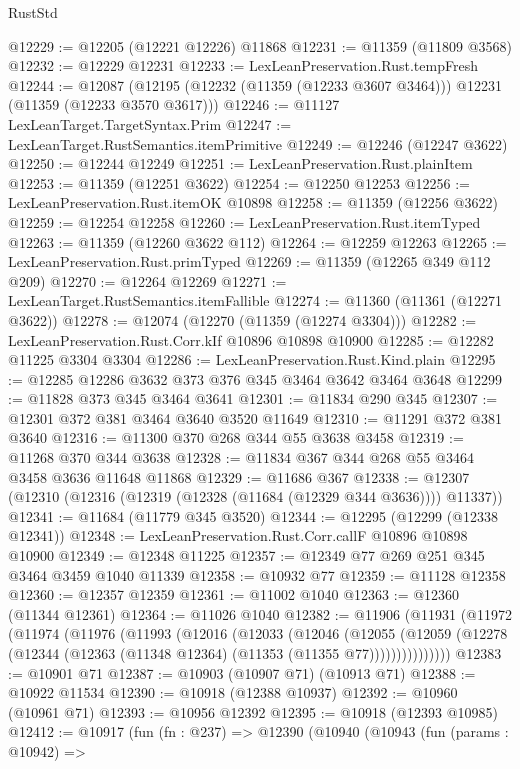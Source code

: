 \begin{lexlean}{RustStd}
\begin{coremodule}
{{{{{{{{{{{{{{{{{{{@12229 := @12205 (@12221 @12226) @11868
@12231 := @11359 (@11809 @3568)
@12232 := @12229 @12231
@12233 := LexLeanPreservation.Rust.tempFresh
@12244 := @12087
    (@12195 (@12232 (@11359 (@12233 @3607 @3464))) @12231 (@11359 (@12233 @3570 @3617)))
@12246 := @11127 LexLeanTarget.TargetSyntax.Prim
@12247 := LexLeanTarget.RustSemantics.itemPrimitive
@12249 := @12246 (@12247 @3622)
@12250 := @12244 @12249
@12251 := LexLeanPreservation.Rust.plainItem
@12253 := @11359 (@12251 @3622)
@12254 := @12250 @12253
@12256 := LexLeanPreservation.Rust.itemOK @10898
@12258 := @11359 (@12256 @3622)
@12259 := @12254 @12258
@12260 := LexLeanPreservation.Rust.itemTyped
@12263 := @11359 (@12260 @3622 @112)
@12264 := @12259 @12263
@12265 := LexLeanPreservation.Rust.primTyped
@12269 := @11359 (@12265 @349 @112 @209)
@12270 := @12264 @12269
@12271 := LexLeanTarget.RustSemantics.itemFallible
@12274 := @11360 (@11361 (@12271 @3622))
@12278 := @12074 (@12270 (@11359 (@12274 @3304)))
@12282 := LexLeanPreservation.Rust.Corr.kIf @10896 @10898 @10900
@12285 := @12282 @11225 @3304 @3304
@12286 := LexLeanPreservation.Rust.Kind.plain
@12295 := @12285 @12286 @3632 @373 @376 @345 @3464 @3642 @3464 @3648
@12299 := @11828 @373 @345 @3464 @3641
@12301 := @11834 @290 @345
@12307 := @12301 @372 @381 @3464 @3640 @3520 @11649
@12310 := @11291 @372 @381 @3640
@12316 := @11300 @370 @268 @344 @55 @3638 @3458
@12319 := @11268 @370 @344 @3638
@12328 := @11834 @367 @344 @268 @55 @3464 @3458 @3636 @11648 @11868
@12329 := @11686 @367
@12338 := @12307 (@12310 (@12316 (@12319 (@12328 (@11684 (@12329 @344 @3636)))) @11337))
@12341 := @11684 (@11779 @345 @3520)
@12344 := @12295 (@12299 (@12338 @12341))
@12348 := LexLeanPreservation.Rust.Corr.callF @10896 @10898 @10900
@12349 := @12348 @11225
@12357 := @12349 @77 @269 @251 @345 @3464 @3459 @1040 @11339
@12358 := @10932 @77
@12359 := @11128 @12358
@12360 := @12357 @12359
@12361 := @11002 @1040
@12363 := @12360 (@11344 @12361)
@12364 := @11026 @1040
@12382 := @11906
    (@11931
      (@11972
        (@11974
          (@11976
            (@11993
              (@12016
                (@12033
                  (@12046
                    (@12055
                      (@12059
                        (@12278 (@12344 (@12363 (@11348 @12364) (@11353 (@11355 @77)))))))))))))))
@12383 := @10901 @71
@12387 := @10903 (@10907 @71) (@10913 @71)
@12388 := @10922 @11534
@12390 := @10918 (@12388 @10937)
@12392 := @10960 (@10961 @71)
@12393 := @10956 @12392
@12395 := @10918 (@12393 @10985)
@12412 := @10917
    (fun (fn : @237) =>
    @12390
      (@10940
        (@10943
          (fun (params : @10942) =>
}}}}}}}}}}}}}}}}}}}
\end{coremodule}
\end{lexlean}
